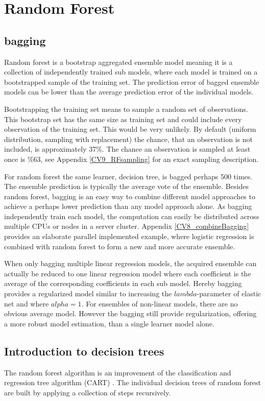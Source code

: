 \section{Random Forest}

\subsection{bagging}
Random forest is a bootstrap aggregated ensemble model meaning it is a collection of independently trained sub models, where each model is trained on a bootstrapped sample of the training set. The prediction error of bagged ensemble models can be lower than the average prediction error of the individual models.

Bootstrapping the training set means to sample a random set of observations. This bootstrap set has the same size as training set and could include every observation of the training set. This would be very unlikely. By default (uniform distribution, sampling with replacement) the chance, that an observation is not included, is approximately 37\%. The chance an observation is sampled at least once is \%63, see Appendix \ref{CV9_RFsampling} for an exact sampling description.

For random forest the same learner, decision tree, is bagged perhaps 500 times. The ensemble prediction is typically the average vote of the ensemble. Besides random forest, bagging is an easy way to combine different model approaches to achieve a perhaps lower prediction than any model approach alone. As bagging independently train each model, the computation can easily be distributed across multiple CPUs or nodes in a server cluster. Appendix \ref{CV8_combineBagging} provides an elaborate parallel implemented example, where logistic regression is combined with random forest to form a new and more accurate ensemble.

When only bagging multiple linear regression models, the acquired ensemble can actually be reduced to one linear regression model where each coefficient is the average of the corresponding coefficients in each sub model. Hereby bagging provides a regularized model similar to increasing the $lambda$-parameter of elastic net and where $alpha=1$. For ensembles of non-linear models, there are no obvious average model. However the bagging still provide regularization, offering a more robust model estimation, than a single learner model alone.

\subsection{Introduction to decision trees}
The random forest algorithm is an improvement of the classification and regression tree algorithm (CART) \cite{breiman1984classification,breiman2001random}. The individual decision trees of random forest are built by applying a collection of steps recursively.

